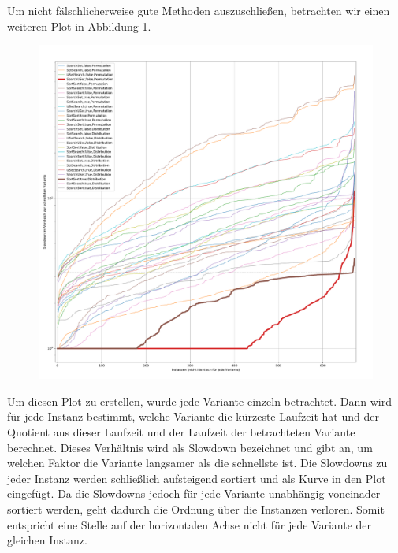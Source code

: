 Um nicht fälschlicherweise \glqq gute\grqq{} Methoden auszuschließen,
betrachten wir einen weiteren Plot in Abbildung \ref{fig:messung_slowdown}. 
\begin{figure}
\centering
	\includegraphics[width = 1\textwidth]{figures/slowdown.pdf}
	\caption{}
	\label{fig:messung_slowdown}
\end{figure}
Um diesen Plot zu erstellen, wurde jede Variante einzeln betrachtet.
Dann wird für jede Instanz bestimmt, welche Variante die kürzeste Laufzeit hat und der Quotient
aus dieser Laufzeit und der Laufzeit der betrachteten Variante berechnet. Dieses Verhältnis wird als Slowdown
bezeichnet und gibt an, um welchen Faktor die Variante langsamer als die schnellste ist. Die Slowdowns
zu jeder Instanz werden schließlich aufsteigend sortiert und als Kurve in den Plot eingefügt.
Da die Slowdowns jedoch für jede Variante unabhängig voneinader sortiert werden, geht dadurch 
die Ordnung über die Instanzen verloren. Somit entspricht eine Stelle auf der horizontalen Achse 
nicht für jede Variante der gleichen Instanz.
\\

